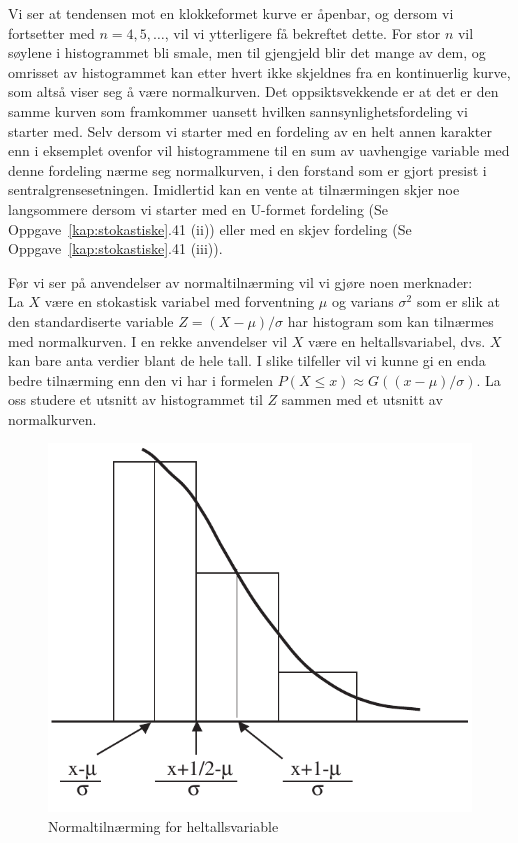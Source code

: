 Vi ser at tendensen mot en klokkeformet kurve er åpenbar, og
dersom vi fortsetter med $n=4, 5, \ldots$, vil vi ytterligere få
bekreftet dette. For stor $n$ vil søylene i histogrammet bli
smale, men til gjengjeld blir det mange av dem, og omrisset av
histogrammet kan etter hvert ikke skjeldnes fra en kontinuerlig
kurve, som altså viser seg å være normalkurven. Det
oppsiktsvekkende er at det er den samme kurven som framkommer
uansett hvilken sannsynlighetsfordeling vi starter med. Selv
dersom vi starter med en fordeling av en helt annen karakter enn
i eksemplet ovenfor vil histogrammene til en sum av uavhengige
variable med denne fordeling nærme seg normalkurven, i den
forstand som er gjort presist i sentralgrensesetningen.
Imidlertid kan en vente at tilnærmingen skjer noe langsommere
dersom vi starter med en U-formet fordeling (Se Oppgave~\ref*{kap:stokastiske}.41
(ii)) eller med en skjev fordeling (Se Oppgave~\ref*{kap:stokastiske}.41 (iii)).
                                    
Før vi ser på anvendelser av normaltilnærming vil vi gjøre noen
merknader: \\

La $X$ være en stokastisk variabel med forventning $\mu$ og
varians ${\sigma}^2$ som er slik at den standardiserte variable
$Z=(X-\mu )/\sigma$ har histogram som kan tilnærmes med
normalkurven. I en rekke anvendelser vil $X$ være en
heltallsvariabel, dvs. $X$ kan bare anta verdier blant de hele
tall. I slike tilfeller vil vi kunne gi en enda bedre tilnærming
enn den vi har i formelen $P(X\leq x)\approx G((x-\mu)/\sigma)$.
La oss studere et utsnitt av histogrammet til $Z$ sammen med et
utsnitt av normalkurven.

\begin{figure}[ht]
\centering
   \includegraphics[scale=0.8]{figurer/fig6_6.pdf} 
\caption{Normaltilnærming for heltallsvariable}
	\label{fig:heltalss_koreks}
\end{figure}


